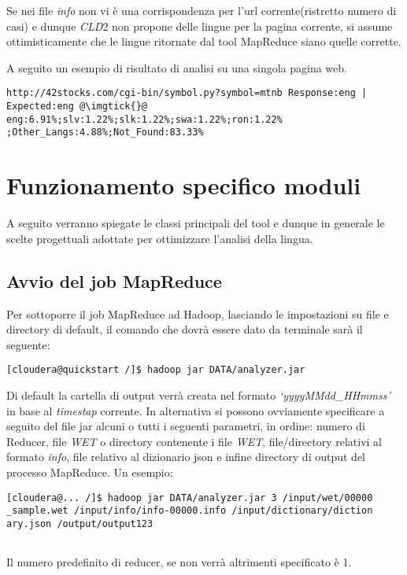 \documentclass{article}
\newcommand{\MR}{MapReduce}
\newcommand{\cld}{\textit{CLD}2}
\newcommand{\WET}{\textit{WET}}
\newcommand{\info}{\textit{info}}
\begin{document}
Se nei file \textit{info} non vi è una corrispondenza per l'url corrente(ristretto numero di casi) e dunque \cld{} non propone delle lingue per la pagina corrente, si assume ottimisticamente che le lingue ritornate dal tool \MR{} siano quelle corrette.

A seguito un esempio di risultato di analisi su una singola pagina web.
\begin{verbatim}
http://42stocks.com/cgi-bin/symbol.py?symbol=mtnb Response:eng |
Expected:eng @\imgtick{}@ eng:6.91%;slv:1.22%;slk:1.22%;swa:1.22%;ron:1.22%
;Other_Langs:4.88%;Not_Found:83.33%
\end{verbatim}

\newpage
\section{Funzionamento specifico moduli}

A seguito verranno spiegate le classi principali del tool e dunque in generale le scelte progettuali adottate per ottimizzare l'analisi della lingua.

\subsection{Avvio del job \MR{}}
Per sottoporre il job \MR{} ad Hadoop, lasciando le impostazioni su file e directory di default, il comando che dovrà essere dato da terminale sarà il seguente:
\begin{verbatim}
[cloudera@quickstart /]$ hadoop jar DATA/analyzer.jar

\end{verbatim}
Di default la cartella di output verrà creata nel formato \textit{`yyyyMMdd\_HHmmss'} in base al \textit{timestap} corrente.
In alternativa si possono ovviamente specificare a seguito del file jar alcuni o tutti i seguenti parametri, in ordine: numero di Reducer, file \WET{} o directory contenente i file \WET{}, file/directory relativi al formato \info{}, file relativo al dizionario json e infine directory di output del processo \MR{}. Un esempio:
\begin{verbatim}
[cloudera@... /]$ hadoop jar DATA/analyzer.jar 3 /input/wet/00000
_sample.wet /input/info/info-00000.info /input/dictionary/diction
ary.json /output/output123
                                
\end{verbatim}
Il numero predefinito di reducer, se non verrà altrimenti specificato è 1.
\end{document}
